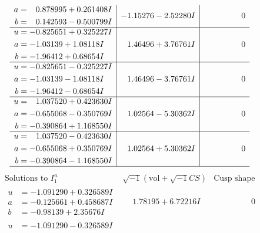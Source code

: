 \documentclass[1p]{elsarticle_modified}
\theoremstyle{definition}
\newcommand{\I}{\sqrt{-1}}
\begin{document}
$$\begin{array}{c|c|c}
\begin{aligned}
a &= \phantom{-}0.878995 + 0.261408 I \\
b &= \phantom{-}0.142593 - 0.500799 I\end{aligned}
 & -1.15276 - 2.52280 I & \phantom{-0.000000 } 0 \\ \hline\begin{aligned}
u &= -0.825651 + 0.325227 I \\
a &= -1.03139 + 1.08118 I \\
b &= -1.96412 + 0.68654 I\end{aligned}
 & \phantom{-}1.46496 + 3.76761 I & \phantom{-0.000000 } 0 \\ \hline\begin{aligned}
u &= -0.825651 - 0.325227 I \\
a &= -1.03139 - 1.08118 I \\
b &= -1.96412 - 0.68654 I\end{aligned}
 & \phantom{-}1.46496 - 3.76761 I & \phantom{-0.000000 } 0 \\ \hline\begin{aligned}
u &= \phantom{-}1.037520 + 0.423630 I \\
a &= -0.655068 - 0.350769 I \\
b &= -0.390864 + 1.168550 I\end{aligned}
 & \phantom{-}1.02564 - 5.30362 I & \phantom{-0.000000 } 0 \\ \hline\begin{aligned}
u &= \phantom{-}1.037520 - 0.423630 I \\
a &= -0.655068 + 0.350769 I \\
b &= -0.390864 - 1.168550 I\end{aligned}
 & \phantom{-}1.02564 + 5.30362 I & \phantom{-0.000000 } 0\\
 \hline 
 \end{array}$$\newpage$$\begin{array}{c|c|c}  
\text{Solutions to }I^u_{1}& \I (\text{vol} + \sqrt{-1}CS) & \text{Cusp shape}\\
 \hline 
\begin{aligned}
u &= -1.091290 + 0.326589 I \\
a &= -0.125661 + 0.458687 I \\
b &= -0.98139 + 2.35676 I\end{aligned}
 & \phantom{-}1.78195 + 6.72216 I & \phantom{-0.000000 } 0 \\ \hline\begin{aligned}
u &= -1.091290 - 0.326589 I \\

\end{aligned}
\end{array}$$
\end{document}
